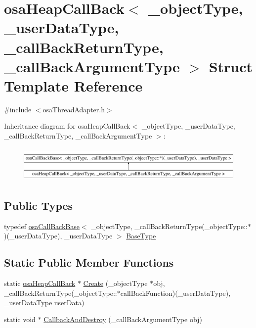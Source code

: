 \hypertarget{structosa_heap_call_back}{}\section{osa\+Heap\+Call\+Back$<$ \+\_\+object\+Type, \+\_\+user\+Data\+Type, \+\_\+call\+Back\+Return\+Type, \+\_\+call\+Back\+Argument\+Type $>$ Struct Template Reference}
\label{structosa_heap_call_back}


{\ttfamily \#include $<$osa\+Thread\+Adapter.\+h$>$}

Inheritance diagram for osa\+Heap\+Call\+Back$<$ \+\_\+object\+Type, \+\_\+user\+Data\+Type, \+\_\+call\+Back\+Return\+Type, \+\_\+call\+Back\+Argument\+Type $>$\+:\begin{figure}[H]
\begin{center}
\leavevmode
\includegraphics[height=1.809370cm]{d0/dbc/structosa_heap_call_back}
\end{center}
\end{figure}
\subsection*{Public Types}
\begin{DoxyCompactItemize}
\item 
typedef \hyperlink{structosa_call_back_base}{osa\+Call\+Back\+Base}$<$ \+\_\+object\+Type, \+\_\+call\+Back\+Return\+Type(\+\_\+object\+Type\+::$\ast$)(\+\_\+user\+Data\+Type), \+\_\+user\+Data\+Type $>$ \hyperlink{structosa_heap_call_back_a5ae1d7cd50191ab6f2026bf10b0fc3b5}{Base\+Type}
\end{DoxyCompactItemize}
\subsection*{Static Public Member Functions}
\begin{DoxyCompactItemize}
\item 
static \hyperlink{structosa_heap_call_back}{osa\+Heap\+Call\+Back} $\ast$ \hyperlink{structosa_heap_call_back_abcd4698c3b9f695d85ea2d253a8e8f27}{Create} (\+\_\+object\+Type $\ast$obj, \+\_\+call\+Back\+Return\+Type(\+\_\+object\+Type\+::$\ast$call\+Back\+Function)(\+\_\+user\+Data\+Type), \+\_\+user\+Data\+Type user\+Data)
\item 
static void $\ast$ \hyperlink{structosa_heap_call_back_a1ae4eb6d5a8f2f0e28ab2ac89756f54d}{Callback\+And\+Destroy} (\+\_\+call\+Back\+Argument\+Type obj)
\end{DoxyCompactItemize}
